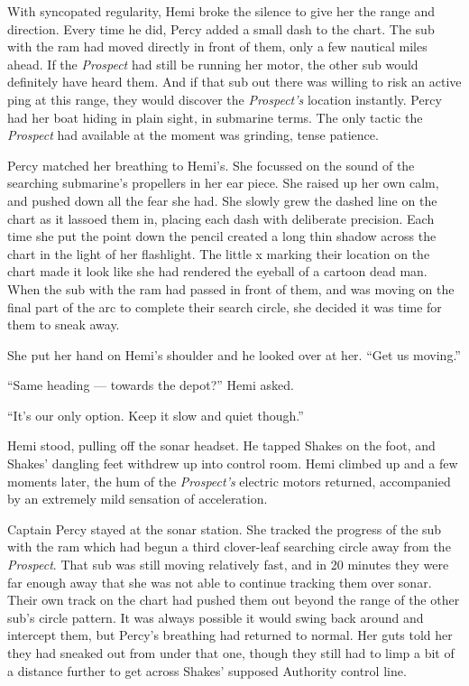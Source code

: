 \documentclass[]{scrbook}
\begin{document}
With syncopated regularity, Hemi broke the silence to give her the range
and direction. Every time he did, Percy added a small dash to the chart.
The sub with the ram had moved directly in front of them, only a few
nautical miles ahead. If the \emph{Prospect} had still be running her
motor, the other sub would definitely have heard them. And if that sub
out there was willing to risk an active ping at this range, they would
discover the \emph{Prospect's} location instantly. Percy had her boat
hiding in plain sight, in submarine terms. The only tactic the
\emph{Prospect} had available at the moment was grinding, tense
patience.

Percy matched her breathing to Hemi's. She focussed on the sound of the
searching submarine's propellers in her ear piece. She raised up her own
calm, and pushed down all the fear she had. She slowly grew the dashed
line on the chart as it lassoed them in, placing each dash with
deliberate precision. Each time she put the point down the pencil
created a long thin shadow across the chart in the light of her
flashlight. The little x marking their location on the chart made it
look like she had rendered the eyeball of a cartoon dead man. When the
sub with the ram had passed in front of them, and was moving on the
final part of the arc to complete their search circle, she decided it
was time for them to sneak away.

She put her hand on Hemi's shoulder and he looked over at her. ``Get us
moving.''

``Same heading --- towards the depot?'' Hemi asked.

``It's our only option. Keep it slow and quiet though.''

Hemi stood, pulling off the sonar headset. He tapped Shakes on the foot,
and Shakes' dangling feet withdrew up into control room. Hemi climbed up
and a few moments later, the hum of the \emph{Prospect's} electric
motors returned, accompanied by an extremely mild sensation of
acceleration.

Captain Percy stayed at the sonar station. She tracked the progress of
the sub with the ram which had begun a third clover-leaf searching
circle away from the \emph{Prospect}. That sub was still moving
relatively fast, and in 20 minutes they were far enough away that she
was not able to continue tracking them over sonar. Their own track on
the chart had pushed them out beyond the range of the other sub's circle
pattern. It was always possible it would swing back around and intercept
them, but Percy's breathing had returned to normal. Her guts told her
they had sneaked out from under that one, though they still had to limp
a bit of a distance further to get across Shakes' supposed Authority
control line.
\end{document}
